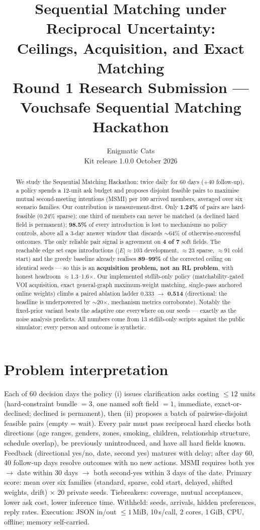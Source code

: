 \documentclass[11pt,a4paper]{article}
\title{Sequential Matching under Reciprocal Uncertainty:\\Ceilings, Acquisition, and Exact Matching\\[2pt]
\large Round 1 Research Submission --- Vouchsafe Sequential Matching Hackathon}
\author{Enigmatic Cats \\ \small Kit release 1.0.0 \quad\textbar\quad 9 October 2026}
\date{}
\begin{document}
\maketitle

\begin{abstract}
\noindent We study the Sequential Matching Hackathon: twice daily for 60 days
(+40 follow-up), a policy spends a 12-unit ask budget and proposes disjoint
feasible pairs to maximise mutual second-meeting intentions (MSMI) per 100
arrived members, averaged over six scenario families. Our contribution is
measurement-first. Only \textbf{1.24\%} of pairs are hard-feasible (0.24\%
sparse); one third of members can never be matched (a declined hard field is
permanent); \textbf{98.5\%} of every introduction is lost to mechanisms no
policy controls, above all a 3-day answer window that discards $\sim$64\% of
otherwise-successful outcomes. The only reliable pair signal is agreement on
\textbf{4 of 7} soft fields. The reachable edge set caps introductions
($|E|\approx103$ development, $\approx$23 sparse, $\approx$91 cold start) and
the greedy baseline already realises \textbf{89--99\%} of the corrected
ceiling on identical seeds --- so this is an \textbf{acquisition problem, not
an RL problem}, with honest headroom $\approx$1.3--1.6$\times$. Our implemented
stdlib-only policy (matchability-gated VOI acquisition, exact general-graph
maximum-weight matching, single-pass anchored online weights) climbs a paired
ablation ladder 0.333 $\to$ \textbf{0.514} (directional: the headline is
underpowered by $\sim$20$\times$, mechanism metrics corroborate). Notably the
fixed-prior variant beats the adaptive one everywhere on our seeds --- exactly
as the noise analysis predicts. All numbers come from 13 stdlib-only scripts
against the public simulator; every person and outcome is synthetic.
\end{abstract}

\section{Problem interpretation}
Each of 60 decision days the policy (i) issues clarification asks costing
$\le 12$ units (hard-constraint bundle $=3$, one named soft field $=1$,
immediate, exact-or-declined; declined is permanent), then (ii) proposes a
batch of pairwise-disjoint feasible pairs (empty = wait). Every pair must pass
reciprocal hard checks both directions (age ranges, genders, zones, smoking,
children, relationship structure, schedule overlap), be previously unintroduced,
and have all hard fields known. Feedback (directional yes/no, date, second
yes) matures with delay; after day 60, 40 follow-up days resolve outcomes with
no new actions. MSMI requires both yes $\to$ date within 30 days $\to$ both
second-yes within 3 days of the date. Primary score: mean over six families
(standard, sparse, cold start, delayed, shifted weights, drift) $\times$ 20
private seeds. Tiebreakers: coverage, mutual acceptances, lower ask cost,
lower inference time. Withheld: seeds, arrivals, hidden preferences, reply
rates. Execution: JSON in/out $\le 1$\,MiB, 10\,s/call, 2 cores, 1\,GiB, CPU,
offline; memory self-carried.
\end{document}
